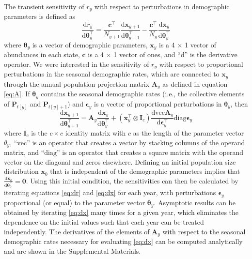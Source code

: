 \documentclass[11pt]{article}
\begin{document}
The transient sensitivity of $r_y$ with respect to perturbations in demographic parameters
is defined as
%
\begin{equation} \label{eq:dr}
\frac{\text{d}r_y}{\text{d}\boldsymbol\theta_y^\top} = 
    \frac{\mathbf{c}^\top}{N_{y+1}} \frac{\text{d}\mathbf{x}_{y+1}}
            {\text{d}\boldsymbol\theta_{y+1}^\top}-
        \frac{\mathbf{c}^\top}{N_{y}} \frac{\text{d}\mathbf{x}_y}
            {\text{d}\boldsymbol\theta_y^\top}
\end{equation}
%
where $\boldsymbol\theta_y$ is a vector of demographic parameters, 
$\mathbf{x}_y$ is a 4 $\times$ 1 vector of abundances in each state,
$\mathbf{c}$ is a 4 $\times$ 1 vector of ones,
and ``$\text{d}$'' is the derivative operator.
We were interested in the sensitivity of $r_y$ with respect to proportional 
perturbations in the seasonal demographic rates,
which are connected to $\mathbf{x}_y$ through the annual population projection matrix
$\mathbf{A}_y$ as defined in equation \ref{eq:A}.
If $\boldsymbol\theta_y$ contains the seasonal demographic rates 
(i.e., the collective elements of $\mathbf{P}_{t[y]}$ and $\mathbf{P}_{t[y]+1}$)
and $\boldsymbol\epsilon_y$ is a vector of proportional perturbations in
$\boldsymbol\theta_y$,
then 
%
\begin{equation} \label{eq:dx}
\frac{\text{d}\mathbf{x}_{y+1}}{\text{d}\boldsymbol\theta_{y+1}^\top} = 
    \mathbf{A}_y \frac{\text{d}\mathbf{x}_{y}}{\text{d}\boldsymbol\theta_y^\top}+
        \left(\mathbf{x}_{y}^\top \otimes \mathbf{I}_c \right)
            \frac{\text{dvec}\mathbf{A}_y}{\text{d}\boldsymbol\epsilon_y^\top}
                \text{diag}\boldsymbol\epsilon_y
\end{equation}
%
where $\mathbf{I}_c$ is the $c \times c$ identity matrix with $c$ as the length
of the parameter vector $\theta_y$,
``$\text{vec}$'' is an operator that creates a vector by stacking columns of the operand matrix,
and ``$\text{diag}$'' is an operator that creates a square matrix with the operand vector on
the diagonal and zeros elsewhere. 
Defining an initial population size distribution $\mathbf{x}_0$ 
that is independent of the demographic parameters implies that 
$\frac{\text{d}\mathbf{x}_0}{\text{d}\boldsymbol\theta_0^\top} = \mathbf{0}$.
Using this initial condition,
the sensitivities can then be calculated by iterating equations \ref{eq:dr} and \ref{eq:dx}
for each year, with perturbations $\boldsymbol\epsilon_y$ proportional (or equal)
to the parameter vector $\boldsymbol\theta_y$.
Asymptotic results can be obtained by iterating \ref{eq:dx} many times for a given year,
which eliminates the dependence on the initial values such that each year can be treated
independently. 
The derivatives of the elements of $\mathbf{A}_y$ with respect to the seasonal
demographic rates necessary for evaluating \ref{eq:dx} can be computed analytically
and are shown in the Supplemental Materials.
\end{document}
